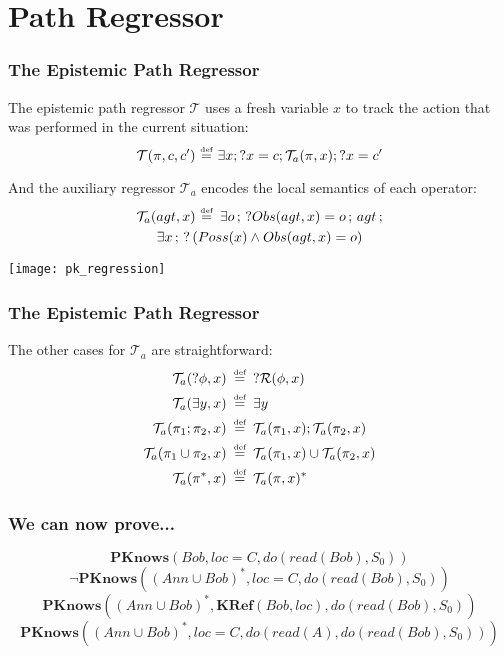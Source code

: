 \documentclass[compress]{beamer}
\newcommand{\isdef}{\hbox{$\stackrel{\mbox{\tiny def}}{=}$}}
\newcommand{\Reg}{\mathcal{R}}
\newcommand{\Trn}{\mathcal{T}}
\newcommand{\TrnA}{\Trn_{a}}
\newcommand{\PKnows}{\mathbf{PKnows}}
\begin{document}
\section{Path Regressor}

\begin{frame}
\frametitle{The Epistemic Path Regressor}
The epistemic path regressor $\Trn$ uses a fresh variable $x$ to track the action that was performed in the current situation:
\begin{equation*}
\Trn(\pi,c,c')\,\,\isdef\,\,\exists x ; ?x=c ; \TrnA(\pi,x) ; ?x=c'
\end{equation*}

And the auxiliary regressor $\TrnA$ encodes the local semantics of each operator:
\begin{multline*}
\TrnA(agt,x) \,\,\isdef \,\,\,\exists o\,;\,?Obs(agt,x)=o\,;\,agt\,;\\
   \exists x\,;\,?\left(Poss(x)\wedge Obs(agt,x)=o\right)
\end{multline*}
\end{frame}

\begin{frame}
\begin{center}
  \texttt{[image: pk\_regression]}
\end{center}
\end{frame}

\begin{frame}
\frametitle{The Epistemic Path Regressor}
The other cases for $\TrnA$ are straightforward:
\begin{align*}
\TrnA(?\phi,x) & \,\,\,\isdef\,\,\,?\Reg(\phi,x) \\
\TrnA(\exists y,x) & \,\,\,\isdef\,\,\,\exists y \\
\TrnA(\pi_1 ; \pi_2,x) & \,\,\,\isdef\,\,\,\TrnA(\pi_1,x) ; \TrnA(\pi_2,x) \\
\TrnA(\pi_1 \cup \pi_2,x) & \,\,\,\isdef\,\,\,\TrnA(\pi_1,x) \cup \TrnA(\pi_2,x) \\
\TrnA(\pi^*,x) & \,\,\,\isdef\,\,\,\TrnA(\pi,x)^*
\end{align*}
\end{frame}

\begin{frame}
\frametitle{We can now prove...}
\begin{equation*}
\PKnows(Bob,loc = C,do(read(Bob),S_0))
\end{equation*}
\pause
\begin{equation*}
\neg\PKnows((Ann \cup Bob)^*,loc = C,do(read(Bob),S_0))
\end{equation*}
\pause
\begin{equation*}
\PKnows((Ann \cup Bob)^*,\mathbf{KRef}(Bob,loc),do(read(Bob),S_0))
\end{equation*}
\pause
\begin{equation*}
\PKnows((Ann \cup Bob)^*,loc = C,do(read(A), do(read(Bob),S_0)))
\end{equation*}
\end{frame}
\end{document}

